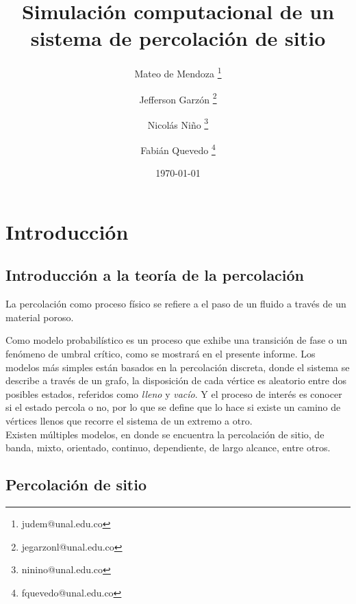\documentclass[11pt,twocolumn]{article}
\title{{\huge{Simulación computacional de un sistema de percolación de sitio}}}
\author[1]{Mateo de Mendoza \thanks{judem@unal.edu.co}}
\author[1]{Jefferson Garzón  \thanks{jegarzonl@unal.edu.co}}
\author[1]{Nicolás Niño \thanks{ninino@unal.edu.co}}
\author[1]{Fabián Quevedo \thanks{fquevedo@unal.edu.co}}
\affil[1]{Universidad Nacional de Colombia, Facultad de Ciencias, Departamento de Física, Bogotá, Colombia.}
\date{\today}
\begin{document}
\maketitle

\section{\textbf{Introducción}}

\subsection{\textbf{Introducción a la teoría de la percolación}}

La percolación como proceso físico se refiere a el paso de un fluido a través de un material poroso.\cite{RAE} %

Como modelo probabilístico es un proceso que exhibe una transición de fase o un fenómeno de umbral crítico, como se mostrará en el presente informe. Los modelos más simples están basados en la percolación discreta, donde el sistema se describe a través de un grafo, la disposición de cada vértice es aleatorio entre dos posibles estados, referidos como \textit{ lleno} y \textit{vacío}. Y el proceso de interés es conocer si el estado percola o no, por lo que se define que lo hace si existe un camino de vértices llenos que recorre el sistema de un extremo a otro.\cite{ams}\\

Existen múltiples modelos, en donde se encuentra la percolación de sitio, de banda, mixto, orientado, continuo, dependiente, de largo alcance, entre otros.\cite{percosite}

\subsection{\textbf{Percolación de sitio}}

\end{document}

